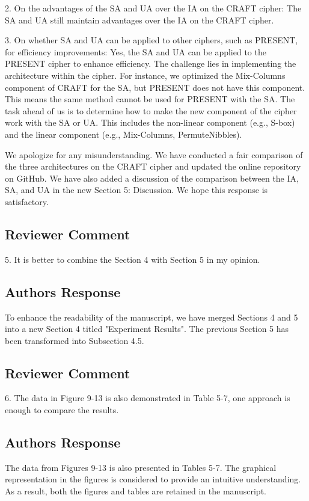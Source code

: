 2. On the advantages of the SA and UA over the IA on the CRAFT cipher: The SA and UA still maintain advantages over the IA on the CRAFT cipher.

3. On whether SA and UA can be applied to other ciphers, such as PRESENT, for efficiency improvements: Yes, the SA and UA can be applied to the PRESENT cipher to enhance efficiency. The challenge lies in implementing the architecture within the cipher. For instance, we optimized the Mix-Columns component of CRAFT for the SA, but PRESENT does not have this component. This means the same method cannot be used for PRESENT with the SA. The task ahead of us is to determine how to make the new component of the cipher work with the SA or UA. This includes the non-linear component (e.g., S-box) and the linear component (e.g., Mix-Columns, PermuteNibbles).

We apologize for any misunderstanding. We have conducted a fair comparison of the three architectures on the CRAFT cipher and updated the online repository on GitHub. We have also added a discussion of the comparison between the IA, SA, and UA in the new Section 5: Discussion. We hope this response is satisfactory.




\subsection{Reviewer Comment}
5. It is better to combine the Section 4 with Section 5 in my opinion.

\subsection{Authors Response}

To enhance the readability of the manuscript, we have merged Sections 4 and 5 into a new Section 4 titled "Experiment Results". The previous Section 5 has been transformed into Subsection 4.5.



\subsection{Reviewer Comment}
6. The data in Figure 9-13 is also demonstrated in Table 5-7, one approach is enough to compare the results.

\subsection{Authors Response}

The data from Figures 9-13 is also presented in Tables 5-7. The graphical representation in the figures is considered to provide an intuitive understanding. As a result, both the figures and tables are retained in the manuscript.

